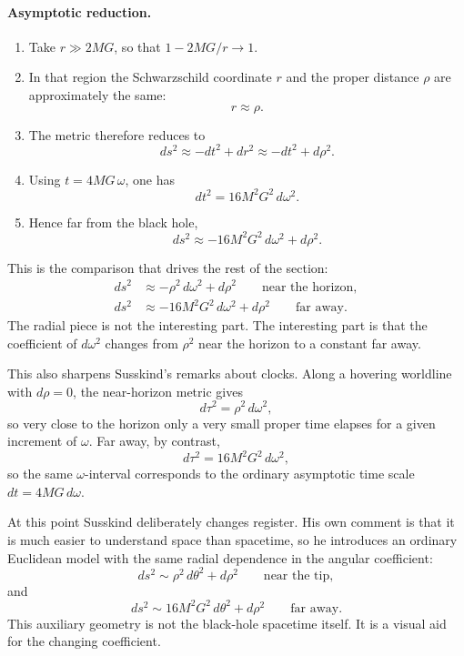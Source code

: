 \paragraph{Asymptotic reduction.}
\begin{enumerate}
\item Take \(r\gg 2MG\), so that \(1-2MG/r\to 1\).
\item In that region the Schwarzschild coordinate \(r\) and the proper distance \(\rho\) are approximately the same:
\[
r\approx \rho.
\]
\item The metric therefore reduces to
\begin{equation}
ds^2\approx -dt^2+dr^2\approx -dt^2+d\rho^2.
\end{equation}
\item Using \(t=4MG\,\omega\), one has
\begin{equation}
dt^2=16M^2G^2\,d\omega^2.
\end{equation}
\item Hence far from the black hole,
\begin{equation}
ds^2\approx -16M^2G^2\,d\omega^2+d\rho^2.
\end{equation}
\end{enumerate}

This is the comparison that drives the rest of the section:
\begin{align}
ds^2 &\approx -\rho^2\,d\omega^2+d\rho^2
\qquad \text{near the horizon},\\
ds^2 &\approx -16M^2G^2\,d\omega^2+d\rho^2
\qquad \text{far away}.
\end{align}
The radial piece is not the interesting part. The interesting part is that the coefficient of \(d\omega^2\) changes from \(\rho^2\) near the horizon to a constant far away.

This also sharpens Susskind's remarks about clocks. Along a hovering worldline with \(d\rho=0\), the near-horizon metric gives
\begin{equation}
d\tau^2=\rho^2\,d\omega^2,
\end{equation}
so very close to the horizon only a very small proper time elapses for a given increment of \(\omega\). Far away, by contrast,
\begin{equation}
d\tau^2=16M^2G^2\,d\omega^2,
\end{equation}
so the same \(\omega\)-interval corresponds to the ordinary asymptotic time scale \(dt=4MG\,d\omega\).

At this point Susskind deliberately changes register. His own comment is that it is much easier to understand space than spacetime, so he introduces an ordinary Euclidean model with the same radial dependence in the angular coefficient:
\begin{equation}
ds^2\sim \rho^2\,d\theta^2+d\rho^2
\qquad \text{near the tip},
\end{equation}
and
\begin{equation}
ds^2\sim 16M^2G^2\,d\theta^2+d\rho^2
\qquad \text{far away}.
\end{equation}
This auxiliary geometry is not the black-hole spacetime itself. It is a visual aid for the changing coefficient.


